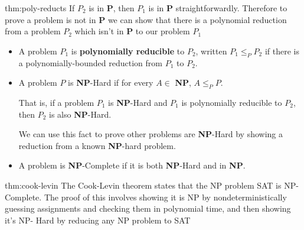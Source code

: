 \documentclass[landscape, 8pt]{extarticle}
\begin{document}
\begin{multicols}{3}
\begin{thm}{thm:poly-reducts}{}
If $P_2$ is in \textbf{P}, then $P_1$ is in \textbf{P} straightforwardly. Therefore to prove a problem is not in \textbf{P} we can show that there is a polynomial reduction from a problem $P_2$ which isn't in \textbf{P} to our problem $P_1$

\renewcommand\labelitemi{\tiny$\bullet$}
\begin{itemize}
    \setlength\itemsep{0em}
    \item A problem $P_1$ is \textbf{polynomially reducible} to $P_2$, written $P_1 \leq_P P_2$ if there is a polynomially-bounded reduction from $P_1$ to $P_2$.
    \item A problem $P$ is \textbf{NP}-Hard if for every $A \in$ \textbf{NP}, $A \leq_P P$.
    
    That is, if a problem $P_1$ is \textbf{NP}-Hard and $P_1$ is polynomially reducible to $P_2$, then $P_2$ is also \textbf{NP}-Hard.
    
    We can use this fact to prove other problems are \textbf{NP}-Hard by showing a reduction from a known \textbf{NP}-hard problem.

    \item A problem is \textbf{NP}-Complete if it is both \textbf{NP}-Hard and in \textbf{NP}.

\end{itemize}

\end{thm}

\newpage

\begin{thm}{thm:cook-levin}{}
The Cook-Levin theorem states that the NP problem SAT is NP-Complete.
\newline
The proof of this involves showing it is NP by nondeterministically guessing
assignments and checking them in polynomial time, and then showing it’s NP-
Hard by reducing any NP problem to SAT
\end{thm}


\end{multicols}
\end{document}
